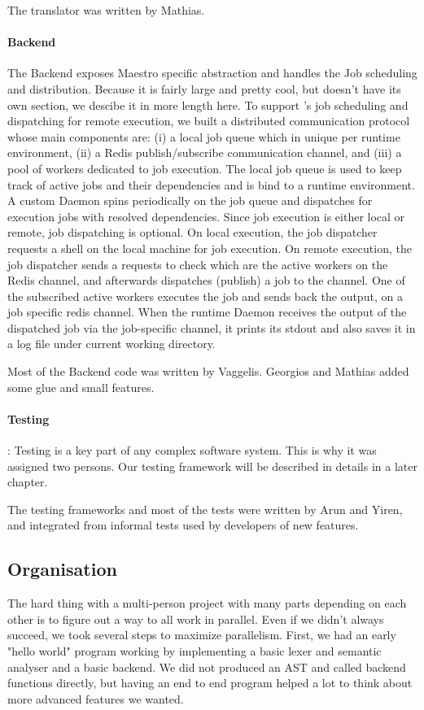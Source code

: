 The translator was written by Mathias.

\paragraph{Backend}

The Backend exposes Maestro specific abstraction and handles the Job scheduling and distribution.
Because it is fairly large and pretty cool, but doesn't have its own section, we descibe it in more length here.
To support \lang{}'s job scheduling and dispatching for remote execution, we
built a distributed communication protocol whose main components are: (i)
a local job queue which in unique per runtime environment, (ii) a Redis
publish/subscribe communication channel, and (iii) a pool of workers dedicated
to job execution. The local job queue is used to keep track of active jobs
and their dependencies and is bind to a runtime environment. A custom Daemon
spins periodically on the job queue and dispatches for execution jobs with
resolved dependencies. Since job execution is either local or remote, job
dispatching is optional. On local execution, the job dispatcher requests a
shell on the local machine for job execution. On remote execution, the job
dispatcher sends a requests to check which are the active workers on the Redis
channel, and afterwards dispatches (publish) a job to the channel. One of the
subscribed active workers executes the job and sends back the output, on a job
specific redis channel. When the runtime Daemon receives the output of the
dispatched job via the job-specific channel, it prints its stdout and also
saves it in a log file under current working directory.

Most of the Backend code was written by Vaggelis. Georgios and Mathias added some glue and small features.

\paragraph{Testing}:
Testing is a key part of any complex software system.
This is why it was assigned two persons.
Our testing framework will be described in details in a later chapter.

The testing frameworks and most of the tests were written by Arun and Yiren, and integrated from informal tests used by developers of new features.


\subsection{Organisation}
The hard thing with a multi-person project with many parts depending on each other is to figure out a way to all work in parallel.
Even if we didn't always succeed, we took several steps to maximize parallelism.
First, we had an early "hello world" program working by implementing a basic lexer and semantic analyser and a basic backend.
We did not produced an AST and called backend functions directly, but having an end to end program helped a lot to think about more advanced features we wanted.

